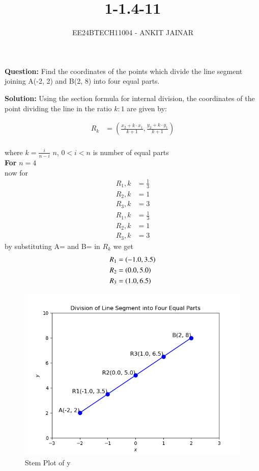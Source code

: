\documentclass[journal]{IEEEtran}
\begin{document}

\vspace{3cm}


\title{1-1.4-11}
\author{EE24BTECH11004 - ANKIT JAINAR
}
{\let\newpage\relax\maketitle}

\renewcommand{\thefigure}{\theenumi}
\renewcommand{\thetable}{\theenumi}
\setlength{\intextsep}{10pt} %


\renewcommand{\thetable}{\theenumi}

\textbf{Question:} Find the coordinates of the points which divide the line segment joining A(-2, 2) and B(2, 8) into four equal parts.

\textbf{Solution:} Using the section formula for internal division, the coordinates of the point dividing the line in the ratio $k:1$ are given by:

\begin{align}
R_k &= \left( \frac{x_2  + k \cdot x_1}{k+1}, \frac{ y_2 + k \cdot y_1}{k+1} \right)
\end{align} 
\\where $k = \frac{i}{n-i}$ $n$, $0<i<n$ is number of equal parts \\

\textbf{For} $n = 4$ \\


now for
\begin{align}
R_1,k&=\frac{1}{3}\\
R_2,k&=1\\
R_3,k&=3
\end{align}
\begin{align}
R_1,k&=\frac{1}{3}
\end{align}
\begin{align}	
R_2,k&=1
\end{align}
\begin{align}
R_3,k&=3
\end{align}
by substituting A= and B= in $R_k$
we get \\
\begin{align}
   R_1&=\left(-1.0,3.5\right)\\
   R_2&=\left(0.0,5.0\right)\\
   R_3&=\left(1.0,6.5\right)\\
\end{align}	

\begin{figure}
    \centering
    \includegraphics[width=0.5\linewidth]{Figure_1.png}
    \caption{Stem Plot of y}
    \label{stemplot}
\end{figure}
\end{document}
